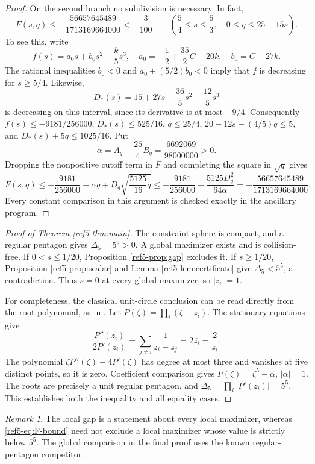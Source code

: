 \documentclass[11pt]{article}
\theoremstyle{remark}
\newtheorem{remark}[theorem]{Remark}
\numberwithin{equation}{section}
\begin{document}
\begin{proof}
On the second branch no subdivision is necessary. In fact,
\begin{equation}\label{ref5-eq:branch-b-analytic}
 F(s,q)\le-\frac{56657645489}{1713169664000}<-\frac3{100}
 \qquad\left(\frac54\le s\le\frac53,\quad 0\le q\le25-15s\right).
\end{equation}
To see this, write
\[
 f(s)=a_0s+b_0s^2-\frac{k}{5}s^3,\quad
 a_0=-\frac12+\frac{35}{2}C+20k,\quad b_0=C-27k.
\]
The rational inequalities $b_0<0$ and $a_0+(5/2)b_0<0$
imply that $f$ is decreasing for $s\ge5/4$. Likewise,
\[
 D_*(s)=15+27s-\frac{36}{5}s^2-\frac{12}{5}s^3
\]
is decreasing on this interval, since its derivative is at most $-9/4$.
Consequently $f(s)\le-9181/256000$, $D_*(s)\le525/16$,
$q\le25/4$, $20-12s-(4/5)q\le5$, and
$D_*(s)+5q\le1025/16$. Put
\[
 \alpha=A_q-\frac{25}{4}B_q=\frac{6692069}{98000000}>0.
\]
Dropping the nonpositive cutoff term in $F$ and completing the square
in $\sqrt q$ gives
\[
 F(s,q)\le-\frac{9181}{256000}-\alpha q
       +D_q\sqrt{\frac{5125}{16}q}
 \le-\frac{9181}{256000}
       +\frac{5125D_q^2}{64\alpha}
 =-\frac{56657645489}{1713169664000}.
\]
Every constant comparison in this argument is checked exactly in the
ancillary program.
\end{proof}

\begin{proof}[Proof of Theorem \ref{ref5-thm:main}]
The constraint sphere is compact, and a regular pentagon gives
$\Delta_5=5^5>0$. A global maximizer exists and is collision-free.
If $0<s\le1/20$, Proposition \ref{ref5-prop:gap} excludes it.
If $s\ge1/20$, Proposition \ref{ref5-prop:scalar} and
Lemma \ref{ref5-lem:certificate} give $\Delta_5<5^5$, a contradiction.
Thus $s=0$ at every global maximizer, so $|z_i|=1$.

For completeness, the classical unit-circle conclusion can be read
directly from the root polynomial, as in \cite{Mordell}.
Let $P(\zeta)=\prod_i(\zeta-z_i)$.
The stationary equations give
\[
 \frac{P''(z_i)}{2P'(z_i)}
 =\sum_{j\ne i}\frac1{z_i-z_j}=2\overline{z_i}=\frac2{z_i}.
\]
The polynomial $\zeta P''(\zeta)-4P'(\zeta)$ has degree at most three
and vanishes at five distinct points, so it is zero.
Coefficient comparison gives $P(\zeta)=\zeta^5-\alpha$, $|\alpha|=1$.
The roots are precisely a unit regular pentagon, and
$\Delta_5=\prod_i|P'(z_i)|=5^5$.
This establishes both the inequality and all equality cases.
\end{proof}

\begin{remark}
The local gap is a statement about every local maximizer, whereas
\eqref{ref5-eq:F-bound} need not exclude a local maximizer whose value is
strictly below $5^5$. The global comparison in the final proof uses the
known regular-pentagon competitor.
\end{remark}
\end{document}

